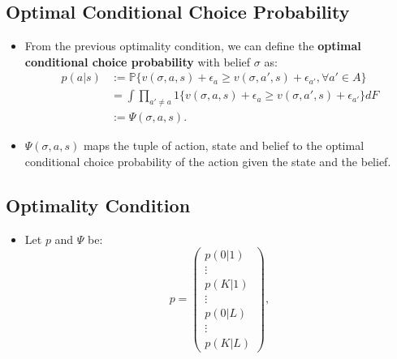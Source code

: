 \documentclass[
]{book}
\providecommand{\tightlist}{%
  \setlength{\itemsep}{0pt}\setlength{\parskip}{0pt}}
\begin{document}
\hypertarget{optimal-conditional-choice-probability}{%
\subsection{Optimal Conditional Choice Probability}\label{optimal-conditional-choice-probability}}

\begin{itemize}
\tightlist
\item
  From the previous optimality condition, we can define the \textbf{optimal conditional choice probability} with belief \(\sigma\) as:
  \begin{equation}
  \begin{split}
  p(a|s) &:= \mathbb{P}\{v(\sigma, a, s) + \epsilon_{a} \ge v(\sigma, a', s) + \epsilon_{a'}, \forall a' \in A\}\\
  &= \int \prod_{a' \neq a} 1\{v(\sigma, a, s) + \epsilon_{a} \ge v(\sigma, a', s) + \epsilon_{a'}\} dF\\
  &:= \Psi(\sigma, a, s).
  \end{split}
  \end{equation}
\item
  \(\Psi(\sigma, a, s)\) maps the tuple of action, state and belief to the optimal conditional choice probability of the action given the state and the belief.
\end{itemize}

\hypertarget{optimality-condition-1}{%
\subsection{Optimality Condition}\label{optimality-condition-1}}

\begin{itemize}
\tightlist
\item
  Let \(p\) and \(\Psi\) be:
  \begin{equation}
  p = 
  \begin{pmatrix}
  p(0|1)\\
  \vdots\\
  p(K|1)\\
  \vdots\\
  p(0|L)\\
  \vdots\\
  p(K|L)
  \end{pmatrix},
  \end{equation}
\end{itemize}
\end{document}
